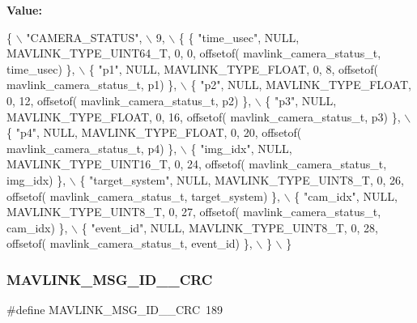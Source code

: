 {\bfseries Value\+:}
\begin{DoxyCode}
\{ \(\backslash\)
    \textcolor{stringliteral}{"CAMERA\_STATUS"}, \(\backslash\)
    9, \(\backslash\)
    \{  \{ \textcolor{stringliteral}{"time\_usec"}, NULL, MAVLINK_TYPE_UINT64_T, 0, 0, offsetof(
      mavlink_camera_status_t, time\_usec) \}, \(\backslash\)
         \{ \textcolor{stringliteral}{"p1"}, NULL, MAVLINK_TYPE_FLOAT, 0, 8, offsetof(
      mavlink_camera_status_t, p1) \}, \(\backslash\)
         \{ \textcolor{stringliteral}{"p2"}, NULL, MAVLINK_TYPE_FLOAT, 0, 12, offsetof(
      mavlink_camera_status_t, p2) \}, \(\backslash\)
         \{ \textcolor{stringliteral}{"p3"}, NULL, MAVLINK_TYPE_FLOAT, 0, 16, offsetof(
      mavlink_camera_status_t, p3) \}, \(\backslash\)
         \{ \textcolor{stringliteral}{"p4"}, NULL, MAVLINK_TYPE_FLOAT, 0, 20, offsetof(
      mavlink_camera_status_t, p4) \}, \(\backslash\)
         \{ \textcolor{stringliteral}{"img\_idx"}, NULL, MAVLINK_TYPE_UINT16_T, 0, 24, offsetof(
      mavlink_camera_status_t, img\_idx) \}, \(\backslash\)
         \{ \textcolor{stringliteral}{"target\_system"}, NULL, MAVLINK_TYPE_UINT8_T, 0, 26, offsetof(
      mavlink_camera_status_t, target\_system) \}, \(\backslash\)
         \{ \textcolor{stringliteral}{"cam\_idx"}, NULL, MAVLINK_TYPE_UINT8_T, 0, 27, offsetof(
      mavlink_camera_status_t, cam\_idx) \}, \(\backslash\)
         \{ \textcolor{stringliteral}{"event\_id"}, NULL, MAVLINK_TYPE_UINT8_T, 0, 28, offsetof(
      mavlink_camera_status_t, event\_id) \}, \(\backslash\)
         \} \(\backslash\)
\}
\end{DoxyCode}
\mbox{\label{mavlink__msg__camera__status_8h_ac5325de80dd706f379f81cc3f170252e}} 
\subsubsection{M\+A\+V\+L\+I\+N\+K\+\_\+\+M\+S\+G\+\_\+\+I\+D\+\_\+\_\+\+C\+RC}
{\footnotesize\ttfamily \#define M\+A\+V\+L\+I\+N\+K\+\_\+\+M\+S\+G\+\_\+\+I\+D\+\_\+\_\+\+C\+RC~189}

\mbox{\label{mavlink__msg__camera__status_8h_a66c45ef5c2ef02b4b6288da1bdc5ddfc}} 
